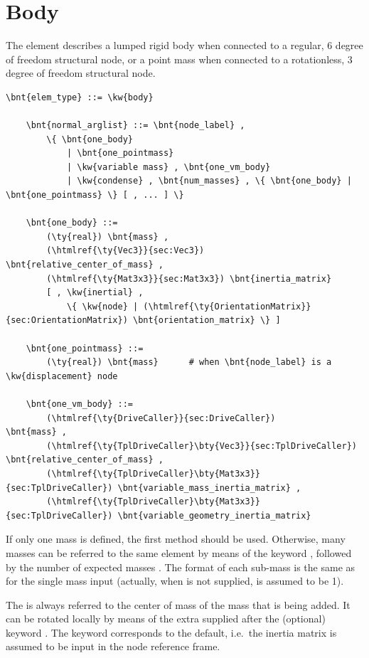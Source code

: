 \section{Body}
The  element describes a lumped rigid body when connected 
to a regular, 6 degree of freedom structural node, or a point mass
when connected to a rotationless, 3 degree of freedom structural node.
\begin{Verbatim}[commandchars=\\\{\}]
    \bnt{elem_type} ::= \kw{body}

    \bnt{normal_arglist} ::= \bnt{node_label} ,
        \{ \bnt{one_body}
            | \bnt{one_pointmass}
            | \kw{variable mass} , \bnt{one_vm_body}
            | \kw{condense} , \bnt{num_masses} , \{ \bnt{one_body} | \bnt{one_pointmass} \} [ , ... ] \}

    \bnt{one_body} ::=
        (\ty{real}) \bnt{mass} , 
        (\htmlref{\ty{Vec3}}{sec:Vec3})   \bnt{relative_center_of_mass} ,
        (\htmlref{\ty{Mat3x3}}{sec:Mat3x3}) \bnt{inertia_matrix}
        [ , \kw{inertial} , 
            \{ \kw{node} | (\htmlref{\ty{OrientationMatrix}}{sec:OrientationMatrix}) \bnt{orientation_matrix} \} ]

    \bnt{one_pointmass} ::=
        (\ty{real}) \bnt{mass}      # when \bnt{node_label} is a \kw{displacement} node

    \bnt{one_vm_body} ::=
        (\htmlref{\ty{DriveCaller}}{sec:DriveCaller})            \bnt{mass} ,
        (\htmlref{\ty{TplDriveCaller}\bty{Vec3}}{sec:TplDriveCaller})   \bnt{relative_center_of_mass} ,
        (\htmlref{\ty{TplDriveCaller}\bty{Mat3x3}}{sec:TplDriveCaller}) \bnt{variable_mass_inertia_matrix} ,
        (\htmlref{\ty{TplDriveCaller}\bty{Mat3x3}}{sec:TplDriveCaller}) \bnt{variable_geometry_inertia_matrix}
\end{Verbatim}
If only one mass is defined, the first method should be used. Otherwise,
many masses can be referred to the same element by means of the keyword
, followed by the number of expected masses .
The format of each sub-mass is the same as for the single mass input (actually, 
when  is not supplied,  is assumed to be 1).

The  is always referred to the center of mass of the
mass that is being added. It can be rotated locally by means of the extra
 supplied after the (optional) keyword .
The keyword  corresponds to the default, i.e.\ the inertia matrix
is assumed to be input in the node reference frame.

